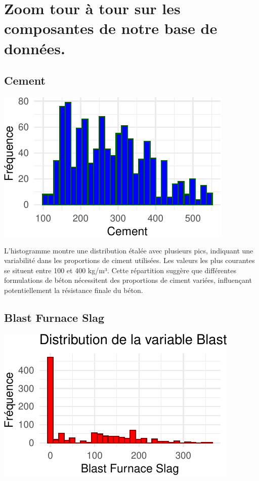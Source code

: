 \documentclass[
  12pt,
]{article}
\begin{document}
\section{Zoom tour à tour sur les composantes de notre base de
données.}\label{zoom-tour-uxe0-tour-sur-les-composantes-de-notre-base-de-donnuxe9es.}

\subsection{Cement}\label{cement}

\begin{center}\includegraphics{rmd_final_files/figure-latex/boxplot_y-1} \end{center}

L'histogramme montre une distribution étalée avec plusieurs pics,
indiquant une variabilité dans les proportions de ciment utilisées. Les
valeurs les plus courantes se situent entre 100 et 400 kg/m³. Cette
répartition suggère que différentes formulations de béton nécessitent
des proportions de ciment variées, influençant potentiellement la
résistance finale du béton.

\subsection{Blast Furnace Slag}\label{blast-furnace-slag}

\begin{center}\includegraphics{rmd_final_files/figure-latex/unnamed-chunk-1-1} \end{center}
\end{document}

